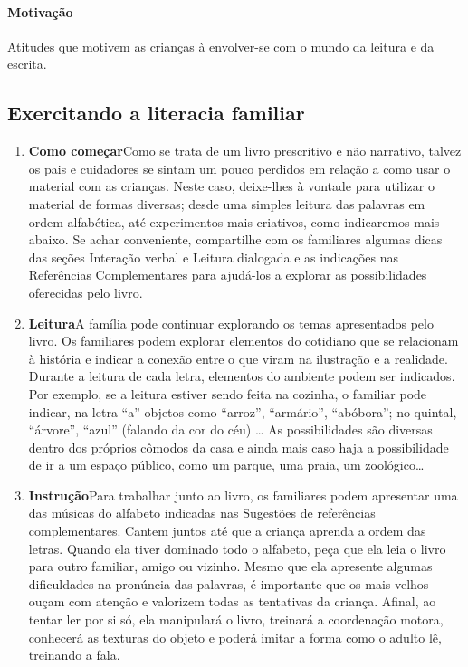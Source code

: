 \documentclass[11pt]{extarticle}
\begin{document}
\paragraph{Motivação} Atitudes que motivem as crianças à envolver-se com 
o mundo da leitura e da escrita.

\subsection{Exercitando a literacia familiar}


\begin{enumerate}
\item \textbf{Como começar}\quad Como se trata de um livro
prescritivo e não narrativo, talvez os pais e cuidadores
se sintam um pouco perdidos em relação a como usar o material
com as crianças. Neste caso, deixe-lhes à vontade para 
utilizar o material de formas diversas; desde uma simples leitura
das palavras em ordem alfabética, até experimentos mais criativos,
como indicaremos mais abaixo. Se achar conveniente, compartilhe com 
os familiares algumas dicas das seções Interação verbal 
e Leitura dialogada e as indicações nas Referências Complementares 
para ajudá-los a explorar as possibilidades oferecidas pelo livro. 

\item \textbf{Leitura}\quad A família pode continuar 
explorando os temas apresentados pelo livro. Os familiares podem explorar 
elementos do cotidiano que se relacionam à história e indicar a conexão 
entre o que viram na ilustração e a realidade. Durante a leitura 
de cada letra, elementos do ambiente podem ser indicados. Por exemplo,
se a leitura estiver sendo feita na cozinha, o familiar pode indicar,
na letra ``a'' objetos como ``arroz'', ``armário'', ``abóbora''; no
quintal, ``árvore'', ``azul'' (falando da cor do céu) \dots{} As possibilidades
são diversas dentro dos próprios cômodos da casa e ainda mais
caso haja a possibilidade de ir a um espaço público, como um parque,
uma praia, um zoológico\dots{}

\item \textbf{Instrução}\quad Para trabalhar junto ao livro,
os familiares podem apresentar uma das músicas do alfabeto
indicadas nas Sugestões de referências complementares.
Cantem juntos até que a criança aprenda a ordem das letras.
Quando ela tiver dominado todo o alfabeto, peça que ela leia
o livro para outro familiar, amigo ou vizinho. Mesmo que ela
apresente algumas dificuldades na pronúncia das palavras, é importante 
que os mais velhos ouçam com atenção e valorizem todas as tentativas 
da criança. Afinal, ao tentar ler por si só, ela manipulará o livro, 
treinará a coordenação motora, conhecerá as texturas do objeto e
poderá imitar a forma como o adulto lê, treinando a fala. 
\end{enumerate}
\end{document}
